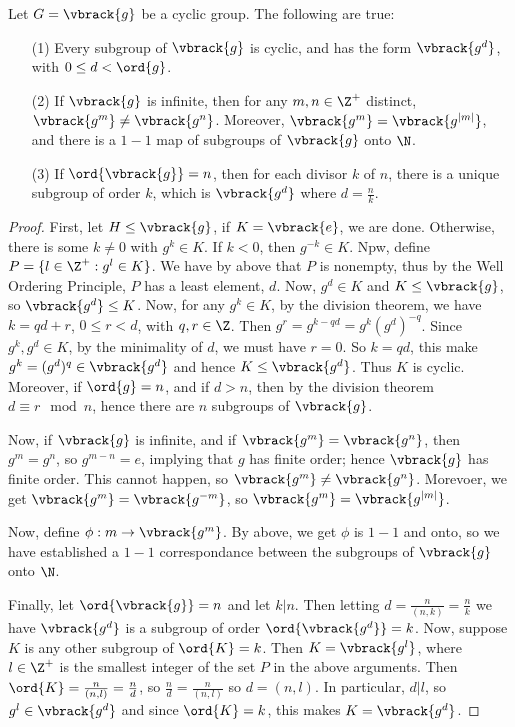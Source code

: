 \begin{theorem}\label{2.3.8}
    Let $G=\vbrack{g}$ be a cyclic group. The following are true:
    \begin{enumerate}
        \item[(1)] Every subgroup of $\vbrack{g}$ is cyclic, and has the form
            $\vbrack{g^d}$, with $0 \leq d < \ord{g}$.

        \item[(2)] If $\vbrack{g}$ is infinite, then for any $m,n \in \Z^+$
            distinct,  $\vbrack{g^m} \neq \vbrack{g^n}$. Moreover,
            $\vbrack{g^m}=\vbrack{g^{|m|}}$, and there is a $1-1$ map of
            subgroups of $\vbrack{g}$ onto $\N$.

        \item[(3)] If $\ord{\vbrack{g}}=n$, then for each divisor $k$ of  $n$,
            there is a unique subgroup of order  $k$, which is  $\vbrack{g^d}$
            where $d=\frac{n}{k}$.
    \end{enumerate}
\end{theorem}
\begin{proof}
    First, let $H \leq \vbrack{g}$, if $K=\vbrack{e}$, we are done. Otherwise,
    there is some $k \neq 0$ with  $g^k \in K$. If  $k<0$, then  $g^{-k} \in K$.
    Npw, define $P=\{l \in \Z^+ : g^l \in K\}$. We have by above that $P$ is
    nonempty, thus by the Well Ordering Principle,  $P$ has a least element,
    $d$. Now,  $g^d \in K$ and  $K \leq \vbrack{g}$, so $\vbrack{g^d} \leq K$.
    Now, for any $g^k \in K$, by the division theorem, we have  $k=qd+r$,
    $0 \leq r < d$, with  $q, r \in \Z$. Then  $g^r=g^{k-qd}=g^k(g^d)^{-q}$.
    Since $g^k,g^d \in K$, by the minimality of  $d$, we must have  $r=0$. So
    $k=qd$, this make $g^k=(g^d)^q \in \vbrack{g^d}$ and hence $K \leq
    \vbrack{g^d}$. Thus $K$ is cyclic. Moreover, if $\ord{g}=n$, and if $d>n$,
    then by the division theorem  $d \equiv r \mod{n}$, hence there are  $n$
    subgroups of $\vbrack{g}$.

    Now, if $\vbrack{g}$ is infinite, and if $\vbrack{g^m}=\vbrack{g^n}$, then
    $g^m=g^n$, so $g^{m-n}=e$, implying that $g$ has finite order; hence
    $\vbrack{g}$ has finite order. This cannot happen, so  $\vbrack{g^m} \neq
    \vbrack{g^n}$. Morevoer, we get $\vbrack{g^m}=\vbrack{g^{-m}}$, so
    $\vbrack{g^m}=\vbrack{g^{|m|}}$.

    Now, define $\phi:m \rightarrow \vbrack{g^m}$. By above, we get $\phi$ is
    $1-1$ and onto, so we have established  a  $1-1$ correspondance between the
    subgroups of  $\vbrack{g}$ onto $\N$.

    Finally, let $\ord{\vbrack{g}}=n$ and let $k|n$. Then letting
    $d=\frac{n}{(n,k)}=\frac{n}{k}$ we have $\vbrack{g^d}$ is a subgroup of
    order $\ord{\vbrack{g^d}}=k$. Now, suppose $K$ is any other subgroup of
    $\ord{K}=k$. Then $K=\vbrack{g^l}$, where $l \in \Z^+$ is the smallest
    integer of the set $P$ in the above arguments. Then
    $\ord{K}=\frac{n}{(n,l)}=\frac{n}{d}$, so $\frac{n}{d}=\frac{n}{(n,l)}$ so
    $d=(n,l)$. In particular, $d|l$, so  $g^l \in \vbrack{g^d}$ and since
    $\ord{K}=k$, this makes $K=\vbrack{g^d}$.
\end{proof}

